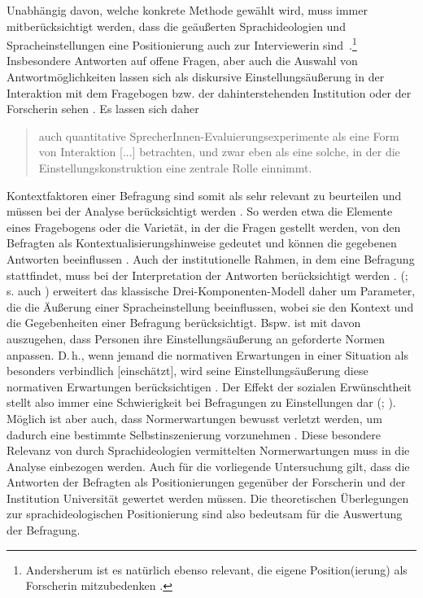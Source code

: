 Unabhängig davon, welche konkrete Methode gewählt wird, muss immer mitberücksichtigt werden, dass die ge{\"a}u{\ss}erten Sprachideologien und Spracheinstellungen eine Positionierung auch zur Interviewerin sind~\citep[s.][133]{Gal.2016}.\footnote{Andersherum ist es natürlich ebenso relevant, die eigene Position(ierung) als Forscherin mitzubedenken \citep[s.][13]{Spitzmuller.2017b}.} 
Insbesondere Antworten auf offene Fragen, aber auch die Auswahl von Antwortmöglichkeiten lassen sich als diskursive Einstellungsäußerung in der Interaktion mit dem Fragebogen bzw. der dahinterstehenden Institution oder der Forscherin sehen \citep[s.][71]{Adler.2018}. 
Es lassen sich daher 
\begin{quote} auch quantitative SprecherInnen-Evaluierungsexperimente als eine Form von Interaktion [...] betrachten, und zwar eben als eine solche, in der die Einstellungskonstruktion eine zentrale Rolle einnimmt. \citep[145]{Soukup.2014}\end{quote} 
Kontextfaktoren einer Befragung sind somit als sehr relevant zu beurteilen und müssen bei der Analyse berücksichtigt werden \citep[s.][46]{Garrett.2012}. 
So werden etwa die Elemente eines Fragebogens oder die Varietät, in der die Fragen gestellt werden, von den Befragten als Kontextualisierungshinweise gedeutet und können die gegebenen Antworten beeinflussen \citep[s.][144]{Riehl.2000}. 
Auch der institutionelle Rahmen, in dem eine Befragung stattfindet, muss bei der Interpretation der Antworten berücksichtigt werden \citep[s.][14]{Konig.2014}. 
\citeauthor{Vandermeeren1996} (\citeyear[159]{Vandermeeren1996}; s. auch \citeyear{Vandermeeren2005}) erweitert das klassische Drei-Komponenten-Modell daher um Parameter, die die Äußerung einer Spracheinstellung beeinflussen, wobei sie den Kontext und die Gegebenheiten einer Befragung berücksichtigt. 
Bspw. ist mit \citet[208--209]{Tophinke.2006} davon auszugehen, dass Personen ihre Einstellungsäußerung an geforderte Normen anpassen. 
D.\,h., wenn jemand \glqq die normativen Erwartungen in einer Situation als besonders verbindlich [einschätzt], wird seine Einstellungsäußerung diese normativen Erwartungen berücksichtigen\grqq{} \citep[209]{Tophinke.2006}. 
Der Effekt der sozialen Erw{\"u}nschtheit stellt also immer eine Schwierigkeit bei Befragungen zu Einstellungen dar (\citealp[s.][182]{Plewnia.2011}; \citealp[44]{Garrett.2012}).
Möglich ist aber auch, dass Normerwartungen bewusst verletzt werden, um dadurch eine bestimmte Selbstinszenierung vorzunehmen \citep[s.][214--215]{Tophinke.2006}.
Diese besondere Relevanz von durch Sprachideologien vermittelten Normerwartungen muss in die Analyse einbezogen werden. %
Auch für die vorliegende Untersuchung gilt, dass die Antworten der Befragten als Positionierungen gegenüber der Forscherin und der Institution Universität gewertet werden müssen. 
Die theoretischen Überlegungen zur sprachideologischen Positionierung sind also bedeutsam für die Auswertung der Befragung. %

